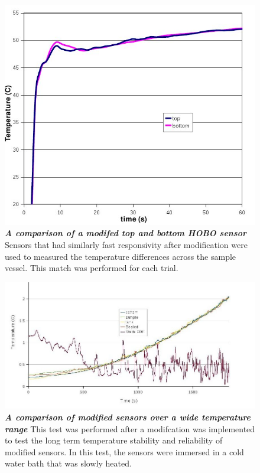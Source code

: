 \documentclass[12pt]{article}
\numberwithin{equation}{section}
\numberwithin{table}{section}
\numberwithin{figure}{section}
\begin{document}
\begin{center}
\begin{figure}[h!]
 \vspace{25mm}
 \centering\includegraphics[scale=0.6]{sensorComp1.jpg}
 \caption[Sensor Responsivity]{\textbf{\emph{A comparison of a modifed top and bottom HOBO sensor}} Sensors that had similarly fast responsivity after modification were used to measured the temperature differences across the sample vessel. This match was performed for each trial.\label{sensComp}}
\end{figure}
\end{center}

\begin{landscape}
\begin{center}
\begin{figure}
 \centering\includegraphics[scale=0.6]{sensorComp2.jpg}
 \caption[Sensor Comparison]{\textbf{\emph{A comparison of modified sensors over a wide temperature range}} This test was performed after a modifcation was implemented to test the long term temperature stability and reliability of modified sensors. In this test, the sensors were immersed in a cold water bath that was slowly heated.\label{sensComp2}}
\end{figure}
\end{center}
\end{landscape}
\end{document}
